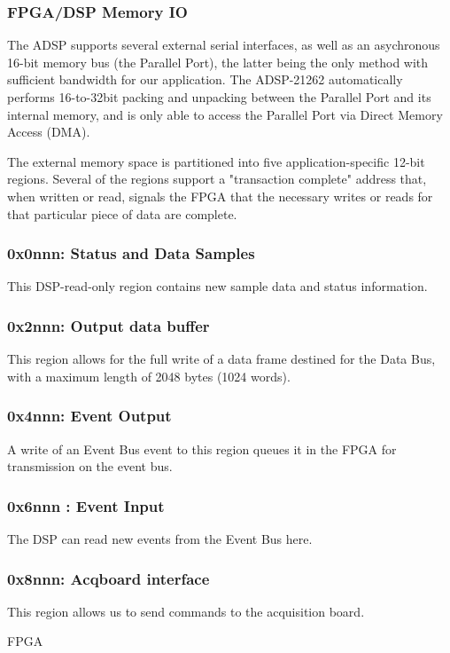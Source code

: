 \documentclass{article}
\begin{document}
\subsubsection{FPGA/DSP Memory IO}

 The ADSP supports several external serial interfaces, as well
as an asychronous 16-bit memory bus (the Parallel Port), the latter
being the only method with sufficient bandwidth for our application.
The ADSP-21262 automatically performs 16-to-32bit packing and
unpacking between the Parallel Port and its internal memory, and is
only able to access the Parallel Port via Direct Memory Access (DMA).


 The external memory space is partitioned into five
application-specific 12-bit regions. Several of the regions support a
"transaction complete" address that, when written or read, signals the
FPGA that the necessary writes or reads for that particular piece of
data are complete.  

\subsubsection{0x0nnn: Status and  Data  Samples}
This DSP-read-only region contains new sample data and status
information.



\subsubsection{0x2nnn: Output data buffer} 
 This region allows for the full write of a data frame destined
for the Data Bus, with a maximum length of 2048 bytes (1024
words).


\subsubsection{0x4nnn: Event Output} 

A write of an Event Bus event to this region queues it in the FPGA for
transmission on the event bus.


\subsubsection{0x6nnn : Event Input}
The DSP can read new events from the Event Bus here. 


\subsubsection{0x8nnn: Acqboard interface}
This region allows us to send commands to the acquisition board. 


{FPGA} 
\end{document}
